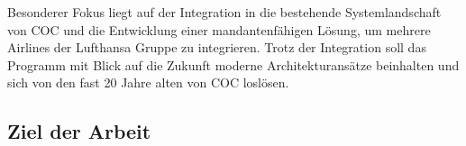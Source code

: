 \documentclass [12pt, a4paper, oneside, titlepage, ngerman]{article}
\begin{document}
\noindent Besonderer Fokus liegt auf der Integration in die bestehende Systemlandschaft von \ac{COC} und die Entwicklung einer mandantenfähigen Lösung, um mehrere Airlines der Lufthansa Gruppe zu integrieren. Trotz der Integration soll das Programm mit Blick auf die Zukunft moderne Architekturansätze beinhalten und sich von den fast 20 Jahre alten von \ac{COC} loslösen.
\\%

\subsection {Ziel der Arbeit} 

\end{document}
